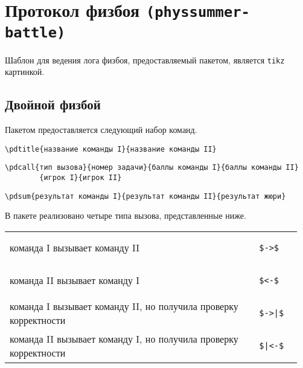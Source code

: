\section{Протокол физбоя \texttt{(physsummer-battle)}}

Шаблон для ведения лога физбоя, предоставляемый пакетом, является \texttt{tikz} картинкой.

\subsection{Двойной физбой}

Пакетом предоставляется следующий набор команд.

\begin{lstlisting}[gobble = 3]
    \pdtitle{название команды I}{название команды II}
\end{lstlisting}

\begin{lstlisting}[gobble = 3]
    \pdcall{тип вызова}{номер задачи}{баллы команды I}{баллы команды II}
        {игрок I}{игрок II}
\end{lstlisting}

\begin{lstlisting}[gobble = 3]
    \pdsum{результат команды I}{результат команды II}{результат жюри}
\end{lstlisting}



В пакете реализовано четыре типа вызова, представленные ниже.

\vspace{0.2cm}

\noindent
\begin{tabular}{S{0.82\linewidth} S{0.145\linewidth}}
    команда I вызывает команду II &
        \begin{lstlisting}[style = listtable, gobble = 7, keepspaces = \false]
            $->$
        \end{lstlisting} \\
    команда II вызывает команду I &
        \begin{lstlisting}[style = listtable, gobble = 7, keepspaces = \false]
            $<-$
        \end{lstlisting} \\
    команда I вызывает команду II, но получила проверку корректности &
        \begin{lstlisting}[style = listtable, gobble = 7, keepspaces = \false]
            $->|$
        \end{lstlisting} \\
    команда II вызывает команду I, но получила проверку корректности &
        \begin{lstlisting}[style = listtable, gobble = 7, keepspaces = \false]
            $|<-$
        \end{lstlisting}
\end{tabular}



